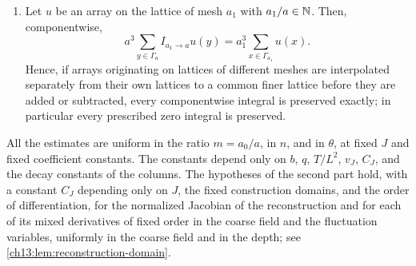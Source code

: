 \begin{lemma}
\begin{enumerate}
\[
 C_{J,q}(1+L/(\eta a_0))^3(1+T/(\eta a_0^2))
\]
points. For the normalized rows $D_a^qW_t(x,\cdot)/A_q(t)$ the same holds, up to a factor which is a fixed power of $1+T/a_0^2$.
\item Let $u$ be an array on the lattice of mesh $a_1$ with $a_1/a\in\mathbb N$. Then, componentwise,
\[
 a^3\sum_{y\in\Gamma_a}I_{a_1\to a}u(y)=a_1^3\sum_{x\in\Gamma_{a_1}}u(x).
\]
Hence, if arrays originating on lattices of different meshes are interpolated separately from their own lattices to a common finer lattice before they are added or subtracted, every componentwise integral is preserved exactly; in particular every prescribed zero integral is preserved.
\end{enumerate}
All the estimates are uniform in the ratio $m=a_0/a$, in $n$, and in $\theta$, at fixed $J$ and fixed coefficient constants. The constants depend only on $b$, $q$, $T/L^2$, $v_J$, $C_J$, and the decay constants of the columns. The hypotheses of the second part hold, with a constant $C_J$ depending only on $J$, the fixed construction domains, and the order of differentiation, for the normalized Jacobian of the reconstruction and for each of its mixed derivatives of fixed order in the coarse field and the fluctuation variables, uniformly in the coarse field and in the depth; see \cref{ch13:lem:reconstruction-domain}.
\end{lemma}

